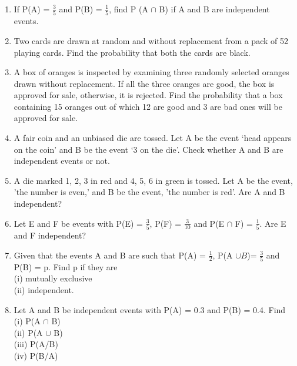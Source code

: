 \begin{enumerate}[label=\arabic*.,ref=\thesubsection.\theenumi]
\item If P(A) = $\frac{3}{5}$ and P(B) = $\frac{1}{5}$, find P (A $\cap$ B) if A and B are independent events.\\\solution



\item Two cards are drawn at random and without replacement from a pack of 52 playing cards. Find the probability that both the cards are black.\\
\solution


\item A box of oranges is inspected by examining three randomly selected oranges drawn without replacement. If all the three oranges are good, the box is approved for sale, otherwise, it is rejected. Find the probability that a box containing 15 oranges out of which 12 are good and 3 are bad ones will be approved for sale.\\

\item A fair coin and an unbiased die are tossed. Let A be the event ‘head appears on
the coin’ and B be the event ‘3 on the die’. Check whether A and B are independent events or not.\\

\item A die marked 1, 2, 3 in red and 4, 5, 6 in green is tossed. Let A be the event, 'the number is even,' and B be the event, 'the number is red'. Are A and B
independent?\\

\item Let E and F be events with P(E) = $\frac{3}{5}$, P(F) = $\frac{3}{10}$ and  P(E $\cap$ F) = $\frac{1}{5}$. Are E and F independent?\\

\item Given that the events A and B are such that P(A) = $\frac{1}{2}$, P(A $\cup B$)= $\frac{3}{5}$ and P(B) = p. Find p if they are\\
(i) mutually exclusive\\
(ii) independent.\\

\item Let A and B be independent events with P(A) = 0.3 and P(B) = 0.4. Find\\
(i) P(A $\cap$ B)\\ 
(ii) P(A $\cup$ B)\\
(iii) P(A/B)\\
(iv) P(B/A)\\


\end{enumerate}
